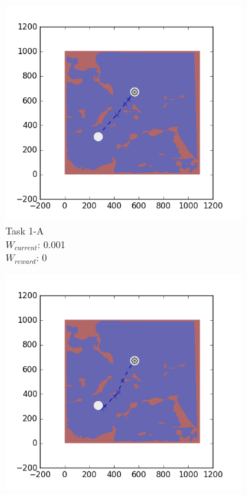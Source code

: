 \documentclass{tamuccthesis}
\begin{document}
\begin{figure}[H]
    \centering
    \begin{subfigure}[b]{0.24\textwidth}
        \centering
        \includegraphics[width=\textwidth,trim={4cm 3cm 2cm 3cm},clip]{EXP3RG_PathAa_-1_-1_0d001_0.png}
        \caption{{\small Task 1-A \\ $W_{current}$: 0.001 \\ $W_{reward}$: 0}}    
        \label{fig:Path_1-A_upCurrent_noReward}
    \end{subfigure}
    \begin{subfigure}[b]{0.24\textwidth}  
        \centering 
        \includegraphics[width=\textwidth,trim={4cm 3cm 2cm 3cm},clip]{EXP3RG_PathAa_-1_-1_0d001_-1.png}

\end{subfigure}
\end{figure}
\end{document}
